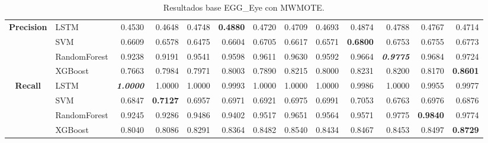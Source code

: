\begin{table}[H]
\begin{adjustbox}{max width=12cm}
\begin{tabular}{|c|l|r|r|r|r|r|r|r|r|r|r|r|}
			\hline
			\textbf{Precision} &  LSTM &  0.4530 &  0.4648 &  0.4748 & \textbf{  0.4880 } &  0.4720 &  0.4709 &  0.4693 &  0.4874 &  0.4788 &  0.4767 &  0.4714 \\
			&  SVM &  0.6609 &  0.6578 &  0.6475 &  0.6604 &  0.6705 &  0.6617 &  0.6571 & \textbf{  0.6800 } &  0.6753 &  0.6755 &  0.6773 \\
			&  RandomForest &  0.9238 &  0.9191 &  0.9541 &  0.9598 &  0.9611 &  0.9630 &  0.9592 &  0.9664 & \textit{ \textbf{  0.9775 } } &  0.9684 &  0.9724 \\
			&  XGBoost &  0.7663 &  0.7984 &  0.7971 &  0.8003 &  0.7890 &  0.8215 &  0.8000 &  0.8231 &  0.8200 &  0.8170 & \textbf{  0.8601 } \\			
			\hline
			\textbf{Recall} &  LSTM & \textit{ \textbf{  1.0000 } } &  1.0000 &  1.0000 &  0.9993 &  1.0000 &  1.0000 &  1.0000 &  0.9986 &  1.0000 &  0.9955 &  0.9977 \\
			&  SVM &  0.6847 & \textbf{  0.7127 } &  0.6957 &  0.6971 &  0.6921 &  0.6975 &  0.6991 &  0.7053 &  0.6763 &  0.6976 &  0.6876 \\
			&  RandomForest &  0.9245 &  0.9286 &  0.9486 &  0.9402 &  0.9517 &  0.9651 &  0.9564 &  0.9571 &  0.9775 & \textbf{  0.9840 } &  0.9774 \\
			&  XGBoost &  0.8040 &  0.8086 &  0.8291 &  0.8364 &  0.8482 &  0.8540 &  0.8434 &  0.8467 &  0.8453 &  0.8497 & \textbf{  0.8729 } \\			
			\hline
		\end{tabular}
	\end{adjustbox}
	\caption{Resultados base EGG\_Eye con MWMOTE.}
	\label{tab:EGGEyeMWMOTE}
\end{table}
